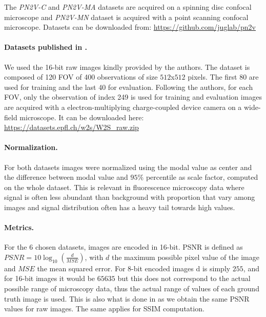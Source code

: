 \documentclass{article}
\begin{document}
The \emph{PN2V-C} and \emph{PN2V-MA} datasets are acquired on a spinning disc confocal microscope and \emph{PN2V-MN} dataset is acquired with a point scanning confocal microscope.
Datasets can be downloaded from: \url{https://github.com/juglab/pn2v}

\paragraph{Datasets published in \cite{zhou2020w2s}.}

We used the 16-bit raw images kindly provided by the authors.
The dataset is composed of 120 FOV of 400 observations of size $512$x$512$ pixels.
The first 80 are used for training and the last 40 for evaluation.
Following the authors, for each FOV, only the observation of index 249 is used for training and evaluation
images are acquired with a electron-multiplying charge-coupled device camera on a wide-field microscope.
It can be downloaded here: \url{https://datasets.epfl.ch/w2s/W2S_raw.zip}

\paragraph{Normalization.}

For both datasets images were normalized using the modal value as center and the difference between modal value and $95\%$ percentile as scale factor, computed on the whole dataset.
This is relevant in fluorescence microscopy data where signal is often less abundant than background with proportion that vary among images and signal distribution often has a heavy tail towards high values.

\paragraph{Metrics.}
For the 6 chosen datasets, images are encoded in 16-bit.
PSNR is defined as $PSNR = 10 \log_{10}(\frac{d}{MSE})$, with $d$ the maximum possible pixel value of the image and $MSE$ the mean squared error.
For 8-bit encoded images d is simply $255$, and for 16-bit images it would be $65635$ but this does not correspond to the actual possible range of microscopy data, thus the actual range of values of each ground truth image is used. This is also what is done in \cite{goncharova2020} as we obtain the same PSNR values for raw images.
The same applies for SSIM computation.
\end{document}
